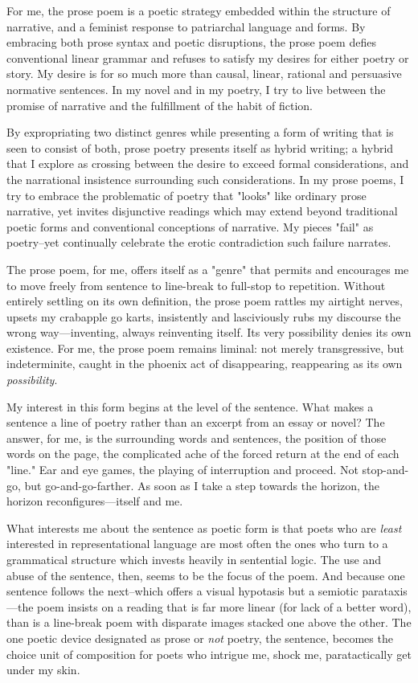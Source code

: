 For me, the prose poem is a poetic strategy embedded within the
structure of narrative, and a feminist response to patriarchal language
and forms. By embracing both prose syntax and poetic disruptions, the
prose poem defies conventional linear grammar and refuses to satisfy my
desires for either poetry or story. My desire is for so much more than
causal, linear, rational and persuasive normative sentences. In my novel
and in my poetry, I try to live between the promise of narrative and the
fulfillment of the habit of fiction.

By expropriating two distinct genres while presenting a form of writing
that is seen to consist of both, prose poetry presents itself as hybrid
writing; a hybrid that I explore as crossing between the desire to
exceed formal considerations, and the narrational insistence surrounding
such considerations. In my prose poems, I try to embrace the problematic
of poetry that "looks" like ordinary prose narrative, yet invites
disjunctive readings which may extend beyond traditional poetic forms
and conventional conceptions of narrative. My pieces "fail" as
poetry--yet continually celebrate the erotic contradiction such failure
narrates.

The prose poem, for me, offers itself as a "genre" that permits and
encourages me to move freely from sentence to line-break to full-stop to
repetition. Without entirely settling on its own definition, the prose
poem rattles my airtight nerves, upsets my crabapple go karts,
insistently and lasciviously rubs my discourse the wrong
way---inventing, always reinventing itself. Its very possibility denies
its own existence. For me, the prose poem remains liminal: not merely
transgressive, but indeterminite, caught in the phoenix act of
disappearing, reappearing as its own \emph{possibility}.

My interest in this form begins at the level of the sentence. What makes
a sentence a line of poetry rather than an excerpt from an essay or
novel? The answer, for me, is the surrounding words and sentences, the
position of those words on the page, the complicated ache of the forced
return at the end of each "line." Ear and eye games, the playing of
interruption and proceed. Not stop-and-go, but go-and-go-farther. As
soon as I take a step towards the horizon, the horizon
reconfigures---itself and me.

What interests me about the sentence as poetic form is that poets who
are \emph{least} interested in representational language are most often
the ones who turn to a grammatical structure which invests heavily in
sentential logic. The use and abuse of the sentence, then, seems to be
the focus of the poem. And because one sentence follows the next--which
offers a visual hypotasis but a semiotic parataxis---the poem insists on
a reading that is far more linear (for lack of a better word), than is a
line-break poem with disparate images stacked one above the other. The
one poetic device designated as prose or \emph{not} poetry, the
sentence, becomes the choice unit of composition for poets who intrigue
me, shock me, paratactically get under my skin.

